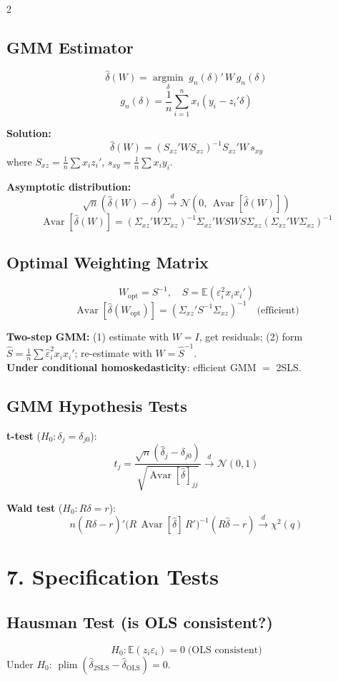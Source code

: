\documentclass[9pt,a4paper]{article}
\newcommand{\plim}{\operatorname{plim}}
\newcommand{\Avar}{\operatorname{Avar}}
\newcommand{\E}{\mathbb{E}}
\begin{document}
\begin{multicols}{2}
\subsection*{GMM Estimator}
\[
  \hat\delta(W) = \operatorname*{argmin}_\delta\; g_n(\delta)'\,W\,g_n(\delta)
\]
\[
  g_n(\delta) = \frac{1}{n}\sum_{i=1}^n x_i(y_i - z_i'\delta)
\]

\textbf{Solution:}
\[
  \hat\delta(W) = (S_{xz}'WS_{xz})^{-1}S_{xz}'W\,s_{xy}
\]
where $S_{xz}=\tfrac{1}{n}\sum x_iz_i'$, $s_{xy}=\tfrac{1}{n}\sum x_iy_i$.

\textbf{Asymptotic distribution:}
\[
  \sqrt{n}(\hat\delta(W)-\delta)\xrightarrow{d}\mathcal{N}(0,\,\Avar[\hat\delta(W)])
\]
\[
  \Avar[\hat\delta(W)] = (\Sigma_{xz}'W\Sigma_{xz})^{-1}\Sigma_{xz}'WSWS\Sigma_{xz}(\Sigma_{xz}'W\Sigma_{xz})^{-1}
\]

\subsection*{Optimal Weighting Matrix}
\[
  W_\text{opt} = S^{-1}, \quad S = \E(\varepsilon_i^2 x_ix_i')
\]
\[
  \Avar[\hat\delta(W_\text{opt})] = (\Sigma_{xz}'S^{-1}\Sigma_{xz})^{-1} \quad\text{(efficient)}
\]

\textbf{Two-step GMM:} (1) estimate with $W=I$, get residuals; (2) form $\hat{S}=\tfrac{1}{n}\sum\hat\varepsilon_i^2 x_ix_i'$; re-estimate with $W=\hat{S}^{-1}$.\\
\textbf{Under conditional homoskedasticity}: efficient GMM $=$ 2SLS.

\subsection*{GMM Hypothesis Tests}

\textbf{t-test} ($H_0\colon\delta_j=\delta_{j0}$):
\[
  t_j = \frac{\sqrt{n}(\hat\delta_j - \delta_{j0})}{\sqrt{\Avar[\hat\delta]_{jj}}} \xrightarrow{d} \mathcal{N}(0,1)
\]

\textbf{Wald test} ($H_0\colon R\delta=r$):
\[
  n(R\hat\delta-r)'\bigl(R\,\Avar[\hat\delta]\,R'\bigr)^{-1}(R\hat\delta-r) \xrightarrow{d}\chi^2(q)
\]

\section{7.\; Specification Tests}

\subsection*{Hausman Test (is OLS consistent?)}
\[
  H_0\colon \E(z_i\varepsilon_i)=0 \;\text{(OLS consistent)}
\]
Under $H_0$: $\plim(\hat\delta_\text{2SLS}-\hat\delta_\text{OLS})=0$.


\end{multicols}
\end{document}
